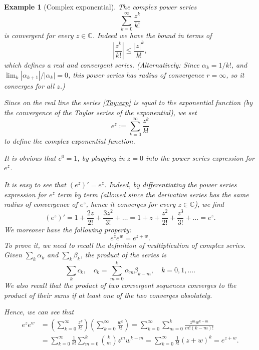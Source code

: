 \documentclass[a4paper,reqno]{amsart}
\numberwithin{equation}{section}
\newtheorem{example}{Example}
\def\C{\mathbb{C}}
\begin{document}
\begin{example}[Complex exponential]
The complex power series
\begin{equation}\label{Tay:exp}
\sum_{k=0}^\infty \frac{z^k}{k!}
\end{equation}
is convergent for every $z\in \C$. Indeed we have the bound in terms of
$$
\left|\frac{z^k}{k!}\right| \leq \frac{|z|^k}{k!},
$$
which defines a real and convergent series. (Alternatively: Since $\alpha_k = 1/k!$, and $\lim_k|\alpha_{k+1}|/|\alpha_k|=0$, this power series has radius of convergence $r=\infty$, so it converges for all $z$.)

\smallskip

\noindent
Since on the real line the series \eqref{Tay:exp} is equal to the exponential function (by the convergence of the Taylor series of the exponential), we set
\begin{equation}\label{complex:exp}
e^z:= \sum_{k=0}^\infty \frac{z^k}{k!}
\end{equation}
to define the \textit{complex exponential function}.

\medskip
\noindent

It is obvious that $e^0 =1$, by plugging in $z= 0$ into the power series expression for $e^z$.
\smallskip

It is easy to see that $(e^z)'=e^z$. Indeed, by differentiating the power series expression for $e^z$ term by term (allowed since the derivative series has the same radius of convergence of $e^z$, hence it converges for every $z\in \C$), we find
$$
(e^z)' = 1+ \frac{2z}{2!} + \frac{3z^2}{3!}+\dots = 1+ z+\frac{z^2}{2!} + \frac{z^3}{3!}+\dots = e^z.
$$
We moreover have the following property:
\begin{equation}
e^z e^w = e^{z+w}.
\end{equation}
To prove it, we need to recall the definition of multiplication of complex series. Given $\sum_k \alpha_k$ and $\sum_k \beta_k$, the product of the series is
$$
\sum_k c_k, \quad c_k = \sum_{m=0}^k \alpha_m \beta_{k-m}, \quad k=0,1,\dots.
$$
We also recall that the product of two convergent sequences converges to the product of their sums if at least one of the two converges absolutely.

\medskip

Hence, we can see that
\begin{align*}
e^z e^w &= \left(\sum_{k=0}^\infty \frac{z^k}{k!}\right)\left(\sum_{k=0}^\infty \frac{w^k}{k!} \right) = \sum_{k=0}^\infty \sum_{m=0}^k  \frac{z^m w^{k-m}}{m!(k-m)!}\\
& = \sum_{k=0}^\infty \frac{1}{k!} \sum_{m=0}^k \binom{k}{m}z^m w^{k-m} = \sum_{k=0}^\infty \frac{1}{k!} (z+w)^k = e^{z+w}.
\end{align*}



\end{example}
\end{document}
